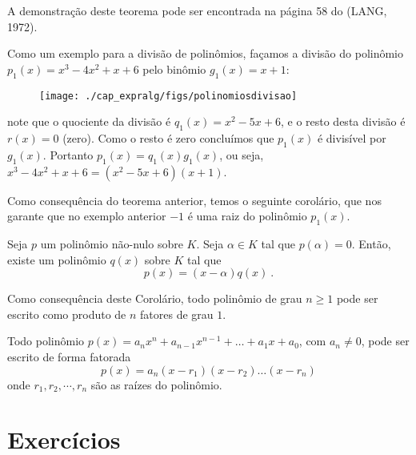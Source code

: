  \begin{dem}
 A demonstração deste teorema pode ser encontrada na página 58 do (LANG, 1972).
 \end{dem}



 \begin{exem}
  Como um exemplo para a divisão de polinômios, façamos a divisão do polinômio $p_1(x)=x^3-4x^2+x+6$ pelo binômio $g_1(x)=x+1$:

 \begin{figure}[H]
 \centering
 \texttt{[image: ./cap\_expralg/figs/polinomiosdivisao]}
 \end{figure}

 note que o quociente da divisão é $q_1(x)= x^2 - 5x + 6$, e o resto desta divisão é $r(x)=0$ (zero). Como o resto é zero concluímos que $p_1(x)$ é divisível por $g_1(x)$. Portanto $p_1(x)= q_1(x)g_1(x)$, ou seja, $x^3-4x^2+x+6= (x^2-5x+6)(x+1)$.
 \end{exem}

 Como consequência do teorema anterior, temos o seguinte corolário, que nos garante que no exemplo anterior $-1$ é uma raiz do polinômio $p_1(x)$.

 \begin{cor}
 Seja $p$ um polinômio não-nulo sobre $K$. Seja $\alpha \in K$ tal que $p(\alpha)=0$. Então, existe um polinômio $q(x)$ sobre $K$ tal que
\begin{equation}
p(x)= (x - \alpha)q(x) \ .
\end{equation}
 \end{cor}

 Como consequência deste Corolário, todo polinômio de grau $n \geq 1$ pode ser escrito como produto de $n$ fatores de grau $1$.

 \begin{teo}
  Todo polinômio $p(x)= a_nx^n + a_{n-1}x^{n-1}+ \ldots + a_1x+ a_0$, com $a_n \neq 0$, pode ser escrito de forma fatorada
\begin{equation}
p(x)= a_n(x - r_1)(x - r_2) \ldots (x - r_n)
\end{equation}
  onde $r_1, r_2, \cdots, r_n$ são as raízes do polinômio.
 \end{teo}
 
 \section{Exercícios}

\construirExer

